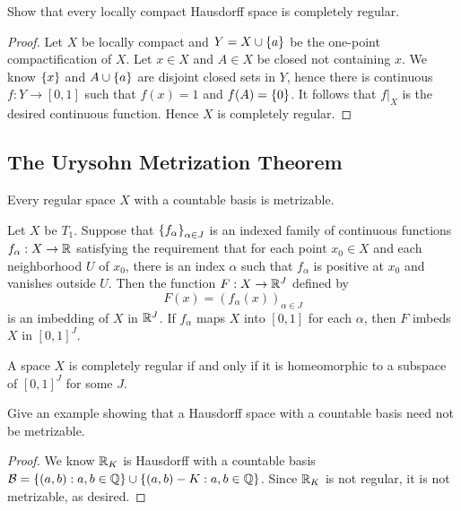 \documentclass[12pt,a4paper]{article}
\begin{document}
    \begin{ex}
        Show that every locally compact Hausdorff space is completely regular.
    \end{ex}
    \begin{proof}
        Let $X$ be locally compact and $Y=X\cup\left\{a\right\}$ be the one-point compactification of $X$. Let $x\in X$ and $A\in X$ be closed not containing $x$. We know $\left\{x\right\}$ and $A\cup\left\{a\right\}$ are disjoint closed sets in $Y$, hence there is continuous $f:Y\to[0,1]$ such that $f(x)=1$ and $f(A)=\left\{0\right\}$. It follows that $f|_X$ is the desired continuous function. Hence $X$ is completely regular.
    \end{proof}
    \hfill

    \subsection{The Urysohn Metrization Theorem}
    \begin{thm}
        Every regular space $X$ with a countable basis is metrizable.
    \end{thm}
    \hfill

    \begin{thm}
        Let $X$ be $T_1$. Suppose that $\left\{f_\alpha\right\}_{\alpha\in J}$ is an indexed family of continuous functions $f_\alpha:X\to\mathbb{R}$ satisfying the requirement that for each point $x_0\in X$ and each neighborhood $U$ of $x_0$, there is an index $\alpha$ such that $f_\alpha$ is positive at $x_0$ and vanishes outside $U$. Then the function $F:X\to\mathbb{R}^J$ defined by
        $$
        F(x)=(f_\alpha(x))_{\alpha\in J}
        $$
        is an imbedding of $X$ in $\mathbb{R}^J$. If $f_\alpha$ maps $X$ into $[0,1]$ for each $\alpha$, then $F$ imbeds $X$ in $[0,1]^J$.
    \end{thm}
    \begin{cor}\label{4.5.3}
        A space $X$ is completely regular if and only if it is homeomorphic to a subspace of $[0,1]^J$ for some $J$.
    \end{cor}
    \hfill

    \begin{ex}
        Give an example showing that a Hausdorff space with a countable basis need not be metrizable.
    \end{ex}
    \begin{proof}
        We know $\mathbb{R}_K$ is Hausdorff with a countable basis $\mathcal{B}=\left\{(a,b):a,b\in\mathbb{Q}\right\} \cup\left\{(a,b)-K:a,b\in\mathbb{Q}\right\}$. Since $\mathbb{R}_K$ is not regular, it is not metrizable, as desired.
    \end{proof}
    \hfill
\end{document}
